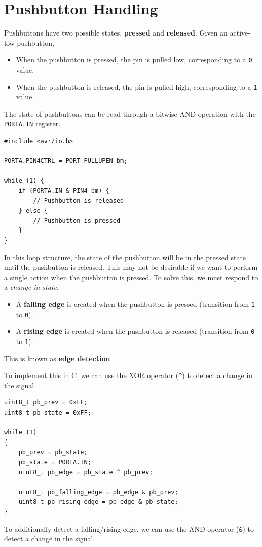 \documentclass[a4paper]{report}
\begin{document}
\section{Pushbutton Handling}
Pushbuttons have two possible states, \textbf{pressed} and \textbf{released}. Given an active-low pushbutton,
\begin{itemize}
    \item When the pushbutton is pressed, the pin is pulled low, corresponding to a \texttt{0} value.
    \item When the pushbutton is released, the pin is pulled high, corresponding to a \texttt{1} value.
\end{itemize}
The state of pushbuttons can be read through a bitwise AND operation with the \texttt{PORTA.IN} register.
\begin{verbatim}
#include <avr/io.h>

PORTA.PIN4CTRL = PORT_PULLUPEN_bm;

while (1) {
    if (PORTA.IN & PIN4_bm) {
        // Pushbutton is released
    } else {
        // Pushbutton is pressed
    }
}
\end{verbatim}
In this loop structure, the state of the pushbutton will be in the pressed state until the pushbutton is released.
This may not be desirable if we want to perform a single action when the pushbutton is pressed.
To solve this, we must respond to a \textit{change in state}.
\begin{itemize}
    \item A \textbf{falling edge} is created when the pushbutton is pressed (transition from \texttt{1} to \texttt{0}).
    \item A \textbf{rising edge} is created when the pushbutton is released (transition from \texttt{0} to \texttt{1}).
\end{itemize}
This is known as \textbf{edge detection}.

To implement this in C, we can use the XOR operator (\texttt{^}) to detect a change in the signal.
\begin{verbatim}
uint8_t pb_prev = 0xFF;
uint8_t pb_state = 0xFF;

while (1)
{
    pb_prev = pb_state;
    pb_state = PORTA.IN;
    uint8_t pb_edge = pb_state ^ pb_prev;

    uint8_t pb_falling_edge = pb_edge & pb_prev;
    uint8_t pb_rising_edge = pb_edge & pb_state;
}
\end{verbatim}
To additionally detect a falling/rising edge, we can use the AND operator (\texttt{&}) to detect a change in the signal.
\end{document}
